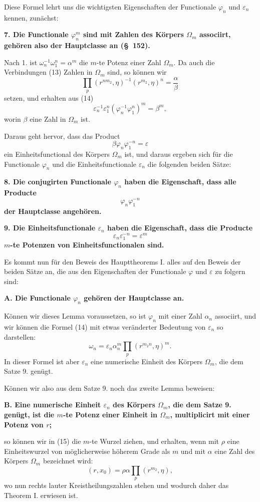 \documentclass[11pt]{article}
\newcommand{\eps}{\varepsilon}
\begin{document}
Diese Formel lehrt uns die wichtigsten Eigenschaften der Functionale $\varphi_n$ und $\eps_n$ kennen, zunächst:

\textbf{7. Die Functionale $\varphi_n^m$ sind mit Zahlen des Körpers $\Omega_m$ associirt, gehören also der Hauptclasse an (\S~152).}

Nach 1. ist $\omega_n^{-1}\omega_1^n=\alpha^m$ die $m$-te Potenz einer Zahl $\Omega_m$. Da auch die Verbindungen (13) Zahlen in $\Omega_m$ sind, so können wir
\[
  \prod_p(r^{nm_2},\eta)^{-1}(r^{m_2},\eta)^n=\frac{\alpha}{\beta}
\]
setzen, und erhalten aus (14)
\[
  \eps_n^{-1}\eps_1^n(\varphi_n^{-1}\varphi_1^n)^m=\beta^m,
\]
worin $\beta$ eine Zahl in $\Omega_m$ ist.

Daraus geht hervor, dass das Product
\[
  \beta\varphi_n\varphi_1^{-n}=\eps
\]
ein Einheitsfunctional des Körpers $\Omega_m$ ist, und daraus ergeben sich für die Functionale $\varphi_n$ und die Einheitsfunctionale $\eps_n$ die folgenden beiden Sätze:

\textbf{8. Die conjugirten Functionale $\varphi_n$ haben die Eigenschaft, dass alle Producte}
\[
  \varphi_n\varphi_1^{-n}
\]
\textbf{der Hauptclasse angehören.}

\textbf{9. Die Einheitsfunctionale $\eps_n$ haben die Eigenschaft, dass die Producte}
\[
  \eps_n\eps_1^{-n}=\eps^m
\]
\textbf{$m$-te Potenzen von Einheitsfunctionalen sind.}

Es kommt nun für den Beweis des Haupttheorems I. alles auf den Beweis der beiden Sätze an, die aus den Eigenschaften der Functionale $\varphi$ und $\eps$ zu folgern sind:

\textbf{A. Die Functionale $\varphi_n$ gehören der Hauptclasse an.}

Können wir dieses Lemma voraussetzen, so ist $\varphi_n$ mit einer Zahl $\alpha_n$ associirt, und wir können die Formel (14) mit etwas veränderter Bedeutung von $\eps_n$ so darstellen:
\begin{equation}
  \omega_n=\eps_n\alpha_n^m\prod_p(r^{m_2 n},\eta)^m.
\tag{15}
\end{equation}
In dieser Formel ist aber $\eps_n$ eine numerische Einheit des Körpers $\Omega_m$, die dem Satze 9. genügt.

Können wir also aus dem Satze 9. noch das zweite Lemma beweisen:

\textbf{B. Eine numerische Einheit $\eps_n$ des Körpers $\Omega_m$, die dem Satze 9. genügt, ist die $m$-te Potenz einer Einheit in $\Omega_m$, multiplicirt mit einer Potenz von $r$;}

so können wir in (15) die $m$-te Wurzel ziehen, und erhalten, wenn mit $\rho$ eine Einheitswurzel von möglicherweise höherem Grade als $m$ und mit $\alpha$ eine Zahl des Körpers $\Omega_m$ bezeichnet wird:
\begin{equation}
  (r,x_0)=\rho\alpha\prod_p(r^{m_2},\eta),
\tag{16}
\end{equation}
wo nun rechts lauter Kreistheilungszahlen stehen und wodurch daher das Theorem I. erwiesen ist.
\end{document}
